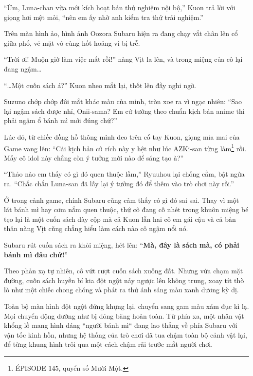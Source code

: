 \documentclass[../main.tex]{subfiles}
\begin{document}
``Ừm, Luna-chan vừa mới kích hoạt bản thử nghiệm nội bộ,'' Kuon trả lời với giọng hơi mệt mỏi, ``nên em ấy nhờ anh kiểm tra thử trải nghiệm.''

Trên màn hình ảo, hình ảnh Oozora Subaru hiện ra đang chạy vắt chân lên cổ giữa phố, vẻ mặt vô cùng hốt hoảng vì bị trễ.

``Trời ơi! Muộn giờ làm việc mất rồi!'' nàng Vịt la lên, và trong miệng của cô lại đang ngậm\dots


``\dots Một cuốn sách á?'' Kuon nheo mắt lại, thốt lên đầy nghi ngờ.

Suzuno chớp chớp đôi mắt khác màu của mình, tròn xoe ra vì ngạc nhiên: ``Sao lại ngậm sách được nhỉ, Onii-sama? Em cứ tưởng theo chuẩn kịch bản anime thì phải ngậm ổ bánh mì mới đúng chứ?''

Lúc đó, từ chiếc đồng hồ thông minh đeo trên cổ tay Kuon, giọng mỉa mai của Game vang lên: ``Cái kịch bản cũ rích này y hệt như lúc AZKi-san từng làm\footnote{{\flaregothic ÉPISODE 145}, quyển số Mười Một.} rồi. Mấy cô idol này chẳng còn ý tưởng mới nào để sáng tạo à?''

``Thảo nào em thấy có gì đó quen thuộc lắm,'' Ryuuhou lại chống cằm, bật ngửa ra. ``Chắc chắn Luna-san đã lấy lại ý tưởng đó để thêm vào trò chơi này rồi.''

Ở trong cảnh game, chính Subaru cũng cảm thấy có gì đó sai sai. Thay vì một lát bánh mì hay cơm nắm quen thuộc, thứ cô đang cố nhét trong khuôn miệng bé tẹo lại là một cuốn sách dày cộp mà cả Kuon lẫn hai cô em gái cậu và cả bản thân nàng Vịt cũng chẳng hiểu làm cách nào cô ngậm nổi nó.

Subaru rút cuốn sách ra khỏi miệng, hét lên: ``\textbf{Mà, đây là sách mà, có phải bánh mì đâu chứ!}''

Theo phản xạ tự nhiên, cô vứt rượt cuốn sách xuống đất. Nhưng vừa chạm mặt đường, cuốn sách huyền bí kia đột ngột nảy ngược lên không trung, xoay tít thò lò như một chiếc chong chóng và phát ra thứ ánh sáng màu xanh dương kỳ dị.

Toàn bộ màn hình đột ngột đứng khựng lại, chuyển sang gam màu xám đục kì lạ. Mọi chuyển động dường như bị đóng băng hoàn toàn. Từ phía xa, một nhân vật khổng lồ mang hình dáng ``người bánh mì`` đang lao thẳng về phía Subaru với vận tốc kinh hồn, nhưng hệ thống của trò chơi đã tua chậm toàn bộ cảnh vật lại, để từng khung hình trôi qua một cách chậm rãi trước mắt người chơi.

\end{document}
